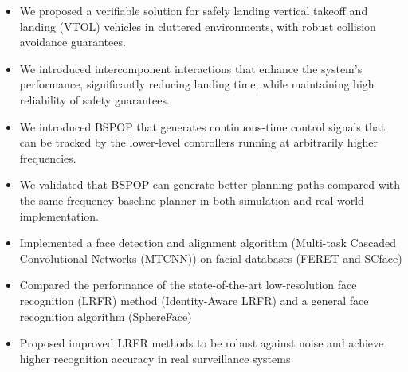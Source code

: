 \documentclass[11pt,letterpaper]{article}
\begin{document}
\cventryspace
{}
\begin{itemize}
  \item We proposed a verifiable solution for safely landing vertical takeoff and landing (VTOL) vehicles in cluttered environments, with robust collision avoidance guarantees.
  \item We introduced intercomponent interactions that enhance the system’s performance, significantly reducing landing time, while maintaining high reliability of safety guarantees.
\end{itemize}
\begin{itemize}
  \item We introduced BSPOP that generates continuous-time control signals that can be tracked by the lower-level controllers running at arbitrarily higher frequencies.
  \item We validated that BSPOP can generate better planning paths compared with the same frequency baseline planner in both simulation and real-world implementation.
\end{itemize}

\cventryspace
{}
\begin{itemize}
  \item Implemented a face detection and alignment algorithm (Multi-task Cascaded Convolutional Networks (MTCNN)) on facial databases (FERET and SCface)
  \item Compared the performance of the state-of-the-art low-resolution face recognition (LRFR) method (Identity-Aware LRFR) and a general face recognition algorithm (SphereFace)
  \item Proposed improved LRFR methods to be robust against noise and achieve higher recognition accuracy in real surveillance systems
\end{itemize}
\end{document}
